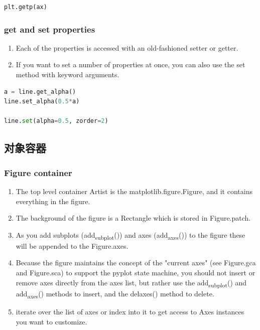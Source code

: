 \documentclass[UTF8,a4paper,12pt]{ctexart}  %
\providecommand{\tightlist}{\setlength{\itemsep}{0pt}\setlength{\parskip}{0pt}}
\begin{document}
\begin{lstlisting}[language=Python]
plt.getp(ax)
\end{lstlisting}

\hypertarget{get-and-set-properties}{%
\subsubsection{get and set properties}\label{get-and-set-properties}}

\begin{enumerate}
\def\labelenumi{\arabic{enumi}.}
\tightlist
\item
  Each of the properties is accessed with an old-fashioned setter or
  getter.
\item
  If you want to set a number of properties at once, you can also use
  the set method with keyword arguments.
\end{enumerate}

\begin{lstlisting}[language=Python]
a = line.get_alpha()
line.set_alpha(0.5*a)

line.set(alpha=0.5, zorder=2)
\end{lstlisting}

\hypertarget{ux5bf9ux8c61ux5bb9ux5668}{%
\subsection{对象容器}\label{ux5bf9ux8c61ux5bb9ux5668}}

\hypertarget{figure-container}{%
\subsubsection{Figure container}\label{figure-container}}

\begin{enumerate}
\def\labelenumi{\arabic{enumi}.}
\tightlist
\item
  The top level container Artist is the matplotlib.figure.Figure, and
  it contains everything in the figure.
\item
  The background of the figure is a Rectangle which is stored in
  Figure.patch.
\item
  As you add subplots (add\textsubscript{subplot}()) and axes (add\textsubscript{axes}()) to the
  figure these will be appended to the Figure.axes.
\item
  Because the figure maintains the concept of the "current axes"
  (see Figure.gca and Figure.sca) to support the pyplot state machine,
  you should not insert or remove axes directly from the axes list,
  but rather use the add\textsubscript{subplot}() and add\textsubscript{axes}() methods to insert,
  and the delaxes() method to delete.
\item
  iterate over the list of axes or index into it to get access to Axes
  instances you want to customize.
\end{enumerate}
\end{document}
